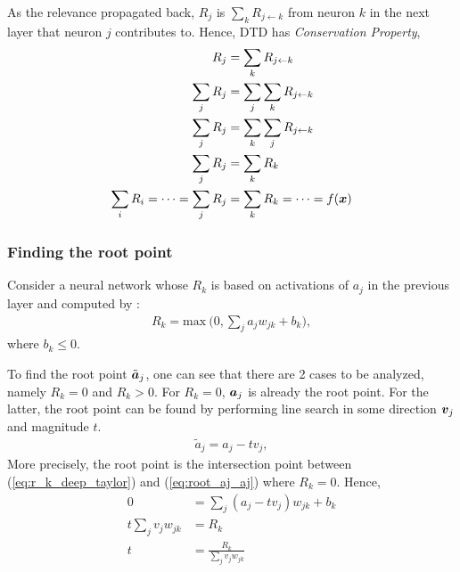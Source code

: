 As the relevance propagated back,  $R_j$ is $\sum_{k} R_{j\leftarrow k}$ from neuron $k$ in the next layer that neuron $j$ contributes to. Hence, DTD has \textit{Conservation Property}, 
\begin{align} 
	R_j &= \sum_{k} R_{j\leftarrow k} \label{eq:rj_from_rk} \\
\sum_{j}	R_j &= \sum_{j} \sum_{k} R_{j\leftarrow k}\\
\sum_{j}	R_j &= \sum_{k} \sum_{j} R_{j\leftarrow k} \\
\sum_{j}	R_j &= \sum_{k}  R_{k} \\
\sum_i 	R_{i} = 	\dots = \sum_j R_{j} &= \sum_k R_{k} = \dots =  f(\patvector{x}) \label{eq:rj_equal_rk}
\end{align}

 
 

\subsubsection{Finding the root point}
Consider a neural network whose $R_k$ is based on activations of $a_j$ in the previous layer and computed by :
\begin{align}\label{eq:r_k_deep_taylor}
R_k = \text{max}\ \bigg(0, \sum_{j} a_j w_{jk}  + b_k \bigg),
\end{align}
where $b_k \le 0 $.

To find the root point $\tilde{\patvector{a}}_j$, one can see that  there are  2 cases to be analyzed, namely $R_k = 0$ and $R_k > 0$. For $R_k=0$,  $\patvector{a}_j$ is already the root point. For the latter, the root point can be found by performing  line search in  some direction $\patvector{v}_j$ and magnitude $t$.
\begin{align}\label{eq:root_aj_aj}
\tilde{a}_j = a_j - t v_j,
\end{align}
More precisely, the root point is the intersection point between (\ref{eq:r_k_deep_taylor}) and (\ref{eq:root_aj_aj}) where $R_k=0$. Hence,
\begin{align}
  0 &= 	\sum_{j} (a_j - t v_j) w_{jk}  + b_k\\
  t \sum_{j} v_j w_{jk} &= R_k \\
  t &= \frac{R_k}{\sum_{j} v_j w_{jk}}
\end{align}

